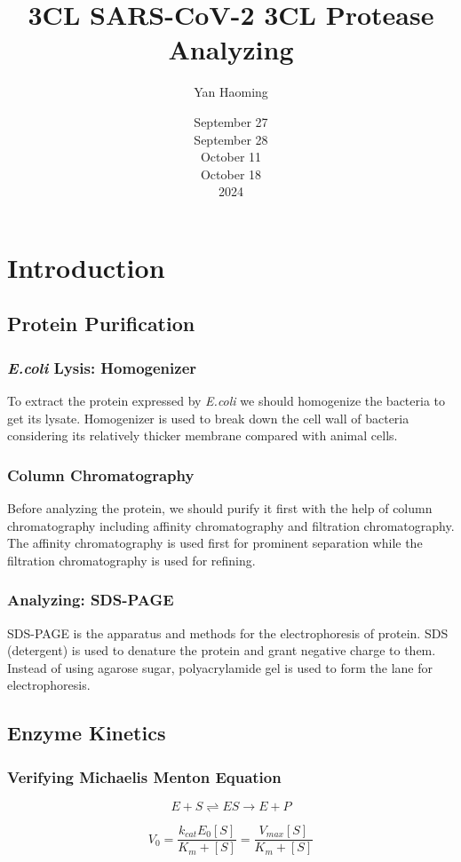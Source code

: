 \documentclass{report}
\title{3CL SARS-CoV-2 3CL Protease Analyzing}
\author{Yan Haoming}
\date{September 27\\September 28\\October 11\\October 18\\2024}
\begin{document}
\maketitle
\chapter{Introduction}
\section{Protein Purification}
\subsection{\textit{E.coli} Lysis: Homogenizer}
To extract the protein expressed by \textit{E.coli} we should homogenize the bacteria to get its lysate.
Homogenizer is used to break down the cell wall of bacteria considering its relatively thicker membrane compared with animal cells.
\subsection{Column Chromatography}
Before analyzing the protein, we should purify it first with the help of column chromatography including affinity chromatography and filtration chromatography.
The affinity chromatography is used first for prominent separation while the filtration chromatography is used for refining.
\subsection{Analyzing: SDS-PAGE}
SDS-PAGE is the apparatus and methods for the electrophoresis of protein.
SDS (detergent) is used to denature the protein and grant negative charge to them.
Instead of using agarose sugar, polyacrylamide gel is used to form the lane for electrophoresis.
\section{Enzyme Kinetics}
\subsection{Verifying Michaelis Menton Equation}
$$
E + S \rightleftharpoons ES \rightarrow E+P
$$

$$
V_0 =\frac{k_{cat}E_0[S]}{K_m+[S]}=\frac{V_{max}[S]}{K_m+[S]}
$$
\end{document}
